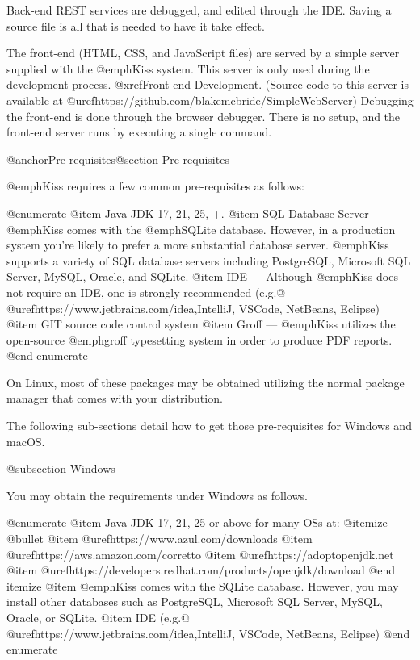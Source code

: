 Back-end REST services are debugged, and edited through the IDE.
Saving a source file is all that is needed to have it take effect.

The front-end (HTML, CSS, and JavaScript files) are served by a simple
server supplied with the @emph{Kiss} system.  This server is only used
during the development process.  @xref{Front-end Development}.
(Source code to this server is available at
@uref{https://github.com/blakemcbride/SimpleWebServer}) Debugging the
front-end is done through the browser debugger.  There is no setup,
and the front-end server runs by executing a single command.

@anchor{Pre-requisites}@section Pre-requisites

@emph{Kiss} requires a few common pre-requisites as follows:


@enumerate
@item
Java JDK 17, 21, 25, +. 
@item
SQL Database Server --- @emph{Kiss} comes with the @emph{SQLite} database.  However, in a production
system you're likely to prefer a more substantial database server.  @emph{Kiss} supports a variety of SQL database servers including 
PostgreSQL, Microsoft SQL Server, MySQL, Oracle, and SQLite.
@item
IDE --- Although @emph{Kiss} does not require an IDE, one is strongly recommended (e.g.@ @uref{https://www.jetbrains.com/idea,IntelliJ}, VSCode, NetBeans, Eclipse)
@item
GIT source code control system
@item
Groff --- @emph{Kiss} utilizes the open-source @emph{groff} typesetting system in order to produce PDF reports.
@end enumerate

On Linux, most of these packages may be obtained utilizing the normal
package manager that comes with your distribution.

The following sub-sections detail how to get those pre-requisites for Windows and macOS.

@subsection Windows


You may obtain the requirements under Windows as follows.

@enumerate
@item
Java JDK 17, 21, 25 or above for many OSs at:
@itemize @bullet
@item
@uref{https://www.azul.com/downloads}
@item
@uref{https://aws.amazon.com/corretto}
@item
@uref{https://adoptopenjdk.net}
@item
@uref{https://developers.redhat.com/products/openjdk/download}
@end itemize
@item
@emph{Kiss} comes with the SQLite database.  However, you may install other databases such as PostgreSQL, Microsoft SQL Server, MySQL,
Oracle, or SQLite.
@item
IDE (e.g.@ @uref{https://www.jetbrains.com/idea,IntelliJ}, VSCode, NetBeans, Eclipse)
@end enumerate

